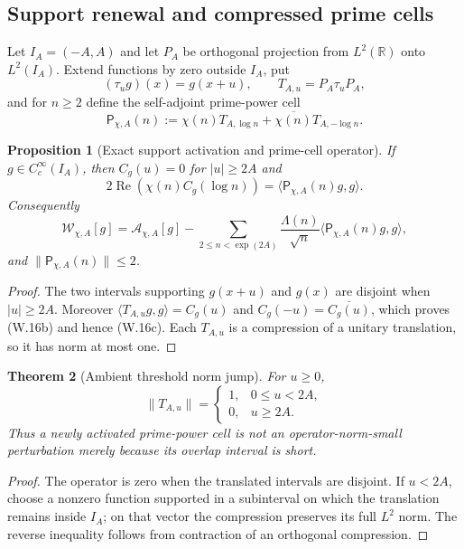 \documentclass[11pt]{article}
\newtheorem{theorem}{Theorem}[section]
\newtheorem{proposition}[theorem]{Proposition}
\theoremstyle{definition}
\theoremstyle{remark}
\newcommand{\R}{\mathbb R}
\begin{document}
\subsection{Support renewal and compressed prime cells}

Let $I_A=(-A,A)$ and let $P_A$ be orthogonal projection from $L^2(\R)$ onto
$L^2(I_A)$.  Extend functions by zero outside $I_A$, put
\[
 (\tau_ug)(x)=g(x+u),
 \qquad
 T_{A,u}=P_A\tau_uP_A,
\]
and for $n\ge2$ define the self-adjoint prime-power cell
\[
 \boxed{
 \mathsf P_{\chi,A}(n)
 :=\chi(n)T_{A,\log n}
  +\overline{\chi(n)}T_{A,-\log n}.}
 \tag{W.16a}
\]

\begin{proposition}[Exact support activation and prime-cell operator]
\label{prop:weil-prime-cell}
If $g\in C_c^\infty(I_A)$, then $C_g(u)=0$ for $|u|\ge2A$ and
\[
 \boxed{
 2\operatorname{Re}\!\left(\chi(n)C_g(\log n)\right)
 =\langle\mathsf P_{\chi,A}(n)g,g\rangle.}
 \tag{W.16b}
\]
Consequently
\[
 \boxed{
 \mathcal W_{\chi,A}[g]
 =\mathcal A_{\chi,A}[g]
 -\sum_{2\le n<\exp(2A)}
  \frac{\Lambda(n)}{\sqrt n}
  \langle\mathsf P_{\chi,A}(n)g,g\rangle,}
 \tag{W.16c}
\]
and $\|\mathsf P_{\chi,A}(n)\|\le2$.
\end{proposition}

\begin{proof}
The two intervals supporting $g(x+u)$ and $g(x)$ are disjoint when
$|u|\ge2A$.  Moreover
$\langle T_{A,u}g,g\rangle=C_g(u)$ and
$C_g(-u)=\overline{C_g(u)}$, which proves \textup{(W.16b)} and hence
\textup{(W.16c)}.  Each $T_{A,u}$ is a compression of a unitary translation,
so it has norm at most one.
\end{proof}

\begin{theorem}[Ambient threshold norm jump]
\label{thm:weil-shift-jump}
For $u\ge0$,
\[
 \boxed{
 \|T_{A,u}\|=
 \begin{cases}
 1,&0\le u<2A,\\
 0,&u\ge2A.
 \end{cases}}
 \tag{W.16d}
\]
Thus a newly activated prime-power cell is not an operator-norm-small
perturbation merely because its overlap interval is short.
\end{theorem}

\begin{proof}
The operator is zero when the translated intervals are disjoint.  If
$u<2A$, choose a nonzero function supported in a subinterval on which the
translation remains inside $I_A$; on that vector the compression preserves
its full $L^2$ norm.  The reverse inequality follows from contraction of an
orthogonal compression.
\end{proof}
\end{document}
